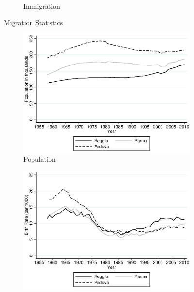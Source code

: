 \begin{figure}[H]
\begin{subfigure}[ht]{0.48\textwidth}
        \caption{Immigration}
        \label{fig:large}
      \end{subfigure}
      \caption{Migration Statistics}  \label{fig:emigr-immigr}
    \end{figure}





\begin{figure}[H]
      \centering
        \begin{subfigure}[t]{0.49\textwidth}
          \includegraphics[width=\textwidth]{../../output/image/population.eps}       
\caption{Population}        
        \end{subfigure}
        \begin{subfigure}[t]{0.49\textwidth}
          \includegraphics[width=\textwidth]{../../output/image/birth_rate.eps}       

\end{subfigure}
\end{figure}
